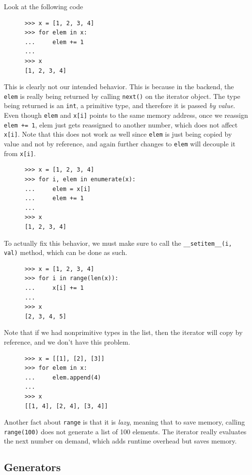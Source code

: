   \begin{example}
    \label{ex:common-trap}
    Look at the following code 
    \begin{lstlisting}
      >>> x = [1, 2, 3, 4]
      >>> for elem in x: 
      ...     elem += 1 
      ... 
      >>> x
      [1, 2, 3, 4] 
    \end{lstlisting}
    This is clearly not our intended behavior. This is because in the backend, the \texttt{elem} is really being returned by calling \texttt{next()} on the iterator object. The type being returned is an \texttt{int}, a primitive type, and therefore it is passed \textit{by value}. Even though \texttt{elem} and \texttt{x[i]} points to the same memory address, once we reassign \texttt{elem += 1}, elem just gets reassigned to another number, which does not affect \texttt{x[i]}. Note that this does not work as well since \texttt{elem} is just being copied by value and not by reference, and again further changes to \texttt{elem} will decouple it from \texttt{x[i]}. 
    \begin{lstlisting}
      >>> x = [1, 2, 3, 4] 
      >>> for i, elem in enumerate(x): 
      ...     elem = x[i]
      ...     elem += 1
      ... 
      >>> x
      [1, 2, 3, 4] 
    \end{lstlisting}
    To actually fix this behavior, we must make sure to call the \texttt{\_\_setitem\_\_(i, val)} method, which can be done as such. 
    \begin{lstlisting}
      >>> x = [1, 2, 3, 4]
      >>> for i in range(len(x)): 
      ...     x[i] += 1 
      ... 
      >>> x
      [2, 3, 4, 5] 
    \end{lstlisting}
    Note that if we had nonprimitive types in the list, then the iterator will copy by reference, and we don't have this problem. 
    \begin{lstlisting}
      >>> x = [[1], [2], [3]]
      >>> for elem in x: 
      ...     elem.append(4)
      ... 
      >>> x
      [[1, 4], [2, 4], [3, 4]] 
    \end{lstlisting}
  \end{example}

  Another fact about \texttt{range} is that it is \textit{lazy}, meaning that to save memory, calling \texttt{range(100)} does not generate a list of 100 elements. The iterator really evaluates the next number on demand, which adds runtime overhead but saves memory.   

\subsection{Generators}

